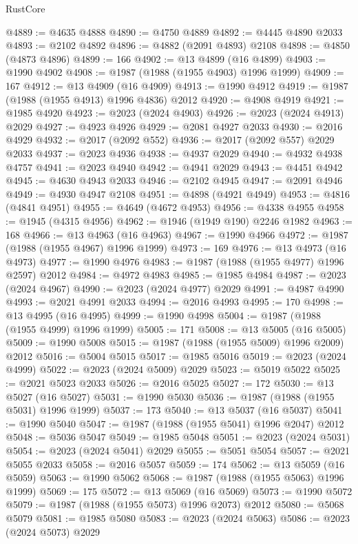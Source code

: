\begin{lexlean}{RustCore}
\begin{coremodule}
@4889 := @4635 @4888
@4890 := @4750 @4889
@4892 := @4445 @4890 @2033
@4893 := @2102 @4892
@4896 := @4882 (@2091 @4893) @2108
@4898 := @4850 (@4873 @4896)
@4899 := 166
@4902 := @13 @4899 (@16 @4899)
@4903 := @1990 @4902
@4908 := @1987 (@1988 (@1955 @4903) @1996 @1999)
@4909 := 167
@4912 := @13 @4909 (@16 @4909)
@4913 := @1990 @4912
@4919 := @1987 (@1988 (@1955 @4913) @1996 @4836) @2012
@4920 := @4908 @4919
@4921 := @1985 @4920
@4923 := @2023 (@2024 @4903)
@4926 := @2023 (@2024 @4913) @2029
@4927 := @4923 @4926
@4929 := @2081 @4927 @2033
@4930 := @2016 @4929
@4932 := @2017 (@2092 @552)
@4936 := @2017 (@2092 @557) @2029 @2033
@4937 := @2023 @4936
@4938 := @4937 @2029
@4940 := @4932 @4938 @4757
@4941 := @2023 @4940
@4942 := @4941 @2029
@4943 := @4451 @4942
@4945 := @4630 @4943 @2033
@4946 := @2102 @4945
@4947 := @2091 @4946
@4949 := @4930 @4947 @2108
@4951 := @4898 (@4921 @4949)
@4953 := @4816 (@4841 @4951)
@4955 := @4649 (@4672 @4953)
@4956 := @4338 @4955
@4958 := @1945 (@4315 @4956)
@4962 := @1946 (@1949 @190) @2246 @1982
@4963 := 168
@4966 := @13 @4963 (@16 @4963)
@4967 := @1990 @4966
@4972 := @1987 (@1988 (@1955 @4967) @1996 @1999)
@4973 := 169
@4976 := @13 @4973 (@16 @4973)
@4977 := @1990 @4976
@4983 := @1987 (@1988 (@1955 @4977) @1996 @2597) @2012
@4984 := @4972 @4983
@4985 := @1985 @4984
@4987 := @2023 (@2024 @4967)
@4990 := @2023 (@2024 @4977) @2029
@4991 := @4987 @4990
@4993 := @2021 @4991 @2033
@4994 := @2016 @4993
@4995 := 170
@4998 := @13 @4995 (@16 @4995)
@4999 := @1990 @4998
@5004 := @1987 (@1988 (@1955 @4999) @1996 @1999)
@5005 := 171
@5008 := @13 @5005 (@16 @5005)
@5009 := @1990 @5008
@5015 := @1987 (@1988 (@1955 @5009) @1996 @2009) @2012
@5016 := @5004 @5015
@5017 := @1985 @5016
@5019 := @2023 (@2024 @4999)
@5022 := @2023 (@2024 @5009) @2029
@5023 := @5019 @5022
@5025 := @2021 @5023 @2033
@5026 := @2016 @5025
@5027 := 172
@5030 := @13 @5027 (@16 @5027)
@5031 := @1990 @5030
@5036 := @1987 (@1988 (@1955 @5031) @1996 @1999)
@5037 := 173
@5040 := @13 @5037 (@16 @5037)
@5041 := @1990 @5040
@5047 := @1987 (@1988 (@1955 @5041) @1996 @2047) @2012
@5048 := @5036 @5047
@5049 := @1985 @5048
@5051 := @2023 (@2024 @5031)
@5054 := @2023 (@2024 @5041) @2029
@5055 := @5051 @5054
@5057 := @2021 @5055 @2033
@5058 := @2016 @5057
@5059 := 174
@5062 := @13 @5059 (@16 @5059)
@5063 := @1990 @5062
@5068 := @1987 (@1988 (@1955 @5063) @1996 @1999)
@5069 := 175
@5072 := @13 @5069 (@16 @5069)
@5073 := @1990 @5072
@5079 := @1987 (@1988 (@1955 @5073) @1996 @2073) @2012
@5080 := @5068 @5079
@5081 := @1985 @5080
@5083 := @2023 (@2024 @5063)
@5086 := @2023 (@2024 @5073) @2029

\end{coremodule}
\end{lexlean}
